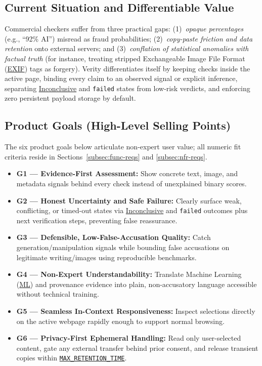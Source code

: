 \documentclass[11pt]{article}
\newcommand{\MaxRetentionTime}{\hyperref[const:MAX_RETENTION_TIME]{\texttt{MAX\_\allowbreak{}RETENTION\_\allowbreak{}TIME}}}
\newcommand{\EXIF}{\hyperlink{acr-exif}{EXIF}}
\newcommand{\ML}{\hyperlink{acr-ml}{ML}}
\newcommand{\TermInconclusive}{\hyperlink{gls-inconclusive}{Inconclusive}}
\begin{document}
\subsection{Current Situation and Differentiable Value}\label{subsec:current-situation}

Commercial checkers suffer from three practical gaps: (1)~\emph{opaque percentages} (e.g., ``92\% AI'') misread as fraud probabilities; (2)~\emph{copy-paste friction and data retention} onto external servers; and (3)~\emph{conflation of statistical anomalies with factual truth} (for instance, treating stripped Exchangeable Image File Format (\EXIF{}) tags as forgery). Verity differentiates itself by keeping checks inside the active page, binding every claim to an observed signal or explicit inference, separating \TermInconclusive{} and \texttt{failed} states from low-risk verdicts, and enforcing zero persistent payload storage by default.

\subsection{Product Goals (High-Level Selling Points)}\label{subsec:product-goals}

The six product goals below articulate non-expert user value; all numeric fit criteria reside in Sections~\ref{subsec:func-reqs} and \ref{subsec:nfr-reqs}.

\begin{itemize}[leftmargin=*, itemsep=2pt]
    \item {}\label{G1}\textbf{G1 --- Evidence-First Assessment:} Show concrete text, image, and metadata signals behind every check instead of unexplained binary scores.
    \item {}\label{G2}\textbf{G2 --- Honest Uncertainty and Safe Failure:} Clearly surface weak, conflicting, or timed-out states via \TermInconclusive{} and \texttt{failed} outcomes plus next verification steps, preventing false reassurance.
    \item {}\label{G3}\textbf{G3 --- Defensible, Low-False-Accusation Quality:} Catch generation/manipulation signals while bounding false accusations on legitimate writing/images using reproducible benchmarks.
    \item {}\label{G4}\textbf{G4 --- Non-Expert Understandability:} Translate Machine Learning (\ML{}) and provenance evidence into plain, non-accusatory language accessible without technical training.
    \item {}\label{G5}\textbf{G5 --- Seamless In-Context Responsiveness:} Inspect selections directly on the active webpage rapidly enough to support normal browsing.
    \item {}\label{G6}\textbf{G6 --- Privacy-First Ephemeral Handling:} Read only user-selected content, gate any external transfer behind prior consent, and release transient copies within \MaxRetentionTime{}.
\end{itemize}
\end{document}

